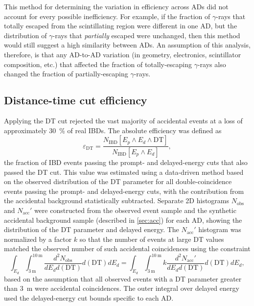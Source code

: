 This method for determining the variation in efficiency across ADs
did not account for every possible inefficiency.
For example, if the fraction of $\gamma$-rays that totally
escaped from the scintillating region were different in one AD,
but the distribution of $\gamma$-rays that \textit{partially} escaped were unchanged,
then this method would still suggest a high similarity between ADs.
An assumption of this analysis, therefore, is that any AD-to-AD variation
(in geometry, electronics, scintillator composition, etc.)
that affected the fraction of totally-escaping $\gamma$-rays
also changed the fraction of partially-escaping $\gamma$-rays.

\subsection{Distance-time cut efficiency}
\label{subsec:eff_DT}

Applying the DT cut rejected the vast majority of accidental events
at a loss of approximately \SI{30}{\percent} of real IBDs.
The absolute efficiency was defined as
\begin{equation}\label{eq:abs_DT_eff}
    \varepsilon_{\text{DT}} = \frac{
        N_\text{IBD}[E_p \wedge E_d \wedge \text{DT}]
    }%
    {
        N_\text{IBD}[E_p \wedge E_d]
    },
\end{equation}
the fraction of IBD events passing the prompt- and delayed-energy cuts
that also passed the DT cut.
This value was estimated using a data-driven method
based on the observed distribution of the DT parameter
for all double-coincidence events passing the prompt- and delayed-energy cuts,
with the contribution from the accidental background
statistically subtracted.
Separate 2D histograms $N_\text{obs}$ and $N_\text{acc}'$
were constructed from the observed event sample
and the synthetic accidental background sample (described in \cref{sec:acc}) for each AD,
showing the distribution of the DT parameter and delayed energy.
The $N_\text{acc}'$ histogram was normalized by a factor $k$ so that
the number of events at large DT values
matched the observed number of such accidental coincidences
using the constraint
\begin{equation}\label{eq:acc_sub_normalized}
    \int_{E_d}\int_{\SI{3}{\m}}^{\SI{10}{\m}}
    \frac{d^2N_\text{obs}}{dE_d d(\text{DT})}
    d(\text{DT}) dE_d
    =
    \int_{E_d}\int_{\SI{3}{\m}}^{\SI{10}{\m}}
    k\frac{d^2N_\text{acc}'}{dE_d d(\text{DT})}
    d(\text{DT}) dE_d,
\end{equation}
based on the assumption that all observed events
with a DT parameter greater than \SI{3}{\m}
were accidental coincidences.
The outer integral over delayed energy
used the delayed-energy cut bounds specific to each AD.

